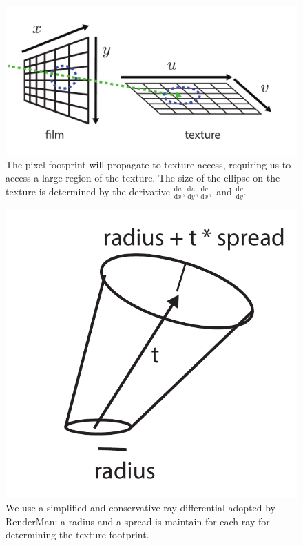 \documentclass{article}
\begin{document}
\begin{figure}
    \centering
    \includegraphics[width=0.4\linewidth]{imgs/texture_filtering.pdf}
    \caption{The pixel footprint will propagate to texture access, requiring us to access a large region of the texture. The size of the ellipse on the texture is determined by the derivative $\frac{\mathrm{d}u}{\mathrm{d}x}, \frac{\mathrm{d}u}{\mathrm{d}y}, \frac{\mathrm{d}v}{\mathrm{d}x},$ and $\frac{\mathrm{d}v}{\mathrm{d}y}$.}
    \label{fig:texture_filtering}
\end{figure}

\begin{figure}
    \centering
    \includegraphics[width=0.3\linewidth]{imgs/ray_differential.pdf}
    \caption{We use a simplified and conservative ray differential adopted by RenderMan: a radius and a spread is maintain for each ray for determining the texture footprint.}
    \label{fig:ray_differential}
\end{figure}
\end{document}
